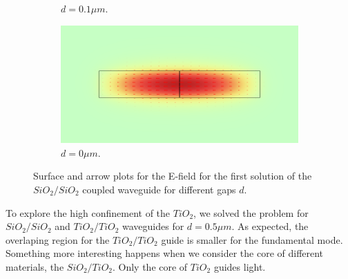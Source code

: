 \documentclass[a4paper,12pt]{article}
\begin{document}
\begin{figure}[H]
\begin{subfigure}{0.45\textwidth}
        \caption{$d = 0.1\mu m$.}
    \end{subfigure}
    \hfill
    \begin{subfigure}{0.45\textwidth}
        \centering
        \includegraphics[scale=0.32]{SiO2_SiO2_normE_0_d0um.png}
        \caption{$d = 0\mu m$.}
    \end{subfigure}
    \caption{Surface and arrow plots for the E-field for the first solution of the $SiO_2/SiO_2$ coupled waveguide for different gaps $d$.}
    \label{fig:varying_d}
\end{figure}

To explore the high confinement of the $TiO_2$, we solved the problem for $SiO_2/SiO_2$ and $TiO_2/TiO_2$ waveguides for $d = 0.5\mu m$. As expected, the overlaping region for the $TiO_2/TiO_2$ guide is smaller for the fundamental mode. Something more interesting happens when we consider the core of different materials, the $SiO_2/TiO_2$. Only the core of $TiO_2$ guides light.
\end{document}
